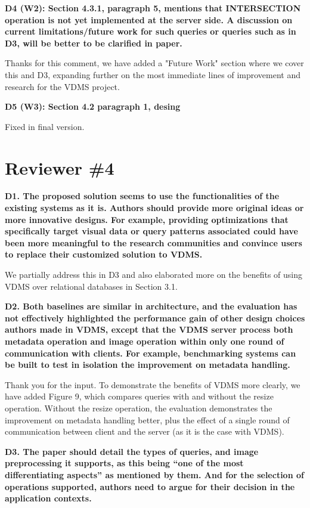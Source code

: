 \documentclass[11pt]{proposalnsf}
\begin{document}
\bigskip
\noindent %
\textbf{
D4 (W2): Section 4.3.1, paragraph 5, mentions that INTERSECTION operation is not
yet implemented at the server side.
A discussion on current limitations/future work for such queries or queries
such as in D3, will be better to be clarified in paper.
}\bigskip

Thanks for this comment, we have added a "Future Work" section where we cover
this and D3, expanding further on the most immediate lines of
improvement and research for the VDMS project.

\bigskip
\noindent %
\textbf{
D5 (W3): Section 4.2 paragraph 1, desing
}\bigskip

Fixed in final version.

\bigskip

\newpage
\section{Reviewer \#4}

\noindent %
\textbf{
D1. The proposed solution seems to use the functionalities of the existing systems
as it is. Authors should provide more original ideas or more innovative designs.
For example, providing optimizations that specifically target visual data or query
patterns associated could have been more meaningful to the research communities and
convince users to replace their customized solution to VDMS.
}\bigskip

We partially address this in D3 and also elaborated more on the benefits of
using VDMS over relational databases in Section 3.1.

\bigskip
\noindent %
\textbf{
D2. Both baselines are similar in architecture, and the evaluation has not effectively
highlighted the performance gain of other design choices authors made in VDMS,
except that the VDMS server process both metadata operation and image operation
within only one round of communication with clients.
For example, benchmarking systems can be built to test in isolation the
improvement on metadata handling.
}\bigskip

Thank you for the input. To demonstrate the benefits of VDMS more clearly,
we have added Figure 9, which compares queries with and without the resize operation.
Without the resize operation, the evaluation demonstrates the
improvement on metadata handling better, plus the effect of a single round
of communication between client and the server (as it is the case with VDMS).

\bigskip
\noindent %
\textbf{
D3. The paper should detail the types of queries, and image preprocessing it supports,
as this being “one of the most differentiating aspects” as mentioned by them.
And for the selection of operations supported, authors need to argue for their
decision in the application contexts.
}\bigskip
\end{document}
